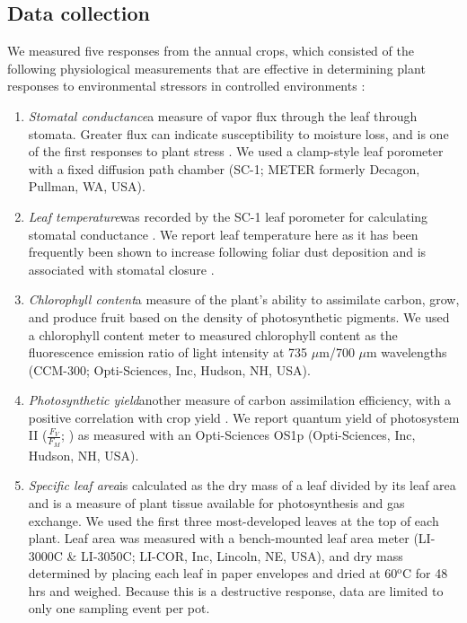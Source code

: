 \documentclass{svjour3}
\begin{document}
\subsection{Data collection} 

We measured five responses from the annual crops, which consisted of the following physiological measurements that are effective in determining plant responses to environmental stressors in controlled environments \citep{mcgranahan2018a}: 
\begin{enumerate}
	\item \emph{Stomatal conductance}\textemdash a measure of vapor flux through the leaf through stomata. 
	Greater flux can indicate susceptibility to moisture loss, and is one of the first responses to plant stress \citep{flexas2002}. 
	We used a clamp-style leaf porometer with a fixed diffusion path chamber (SC-1; METER formerly Decagon, Pullman, WA, USA). 
	\item \emph{Leaf temperature}\textemdash was recorded by the SC-1 leaf porometer for calculating stomatal conductance \citep{metergroup2020}. 
	We report leaf temperature here as it has been frequently been shown to increase following foliar dust deposition and is associated with stomatal closure \citep{eller1977, zia-khan2014}. 
	\item \emph{Chlorophyll content}\textemdash a measure of the plant's ability to assimilate carbon, grow, and produce fruit based on the density of photosynthetic pigments. 
	We used a chlorophyll content meter to measured chlorophyll content as the fluorescence emission ratio of light intensity at 735 $\mu$m/700 $\mu$m wavelengths
	 (CCM-300; Opti-Sciences, Inc, Hudson, NH, USA).
	\item \emph{Photosynthetic yield}\textemdash another measure of carbon assimilation efficiency, with a positive correlation with crop yield \citep{fischer1998}. 
	We report quantum yield of photosystem II ($\frac{F_{V}}{F_{M}}$;  \citet{kalaji2017}) as measured with an Opti-Sciences OS1p (Opti-Sciences, Inc, Hudson, NH, USA). 
	\item \emph{Specific leaf area}\textemdash is calculated as the dry mass of a leaf divided by its leaf area and is a measure of plant tissue available for photosynthesis and gas exchange. 
	We used the first three most-developed leaves at the top of each plant. 
	Leaf area was measured with a bench-mounted leaf area meter (LI-3000C \& LI-3050C; LI-COR, Inc, Lincoln, NE, USA), and dry mass determined by placing each leaf in paper envelopes and dried at 60$^\text{o}$C for 48 hrs and weighed.
	Because this is a destructive response, data are limited to only one sampling event per pot.
\end{enumerate} 
\end{document}
